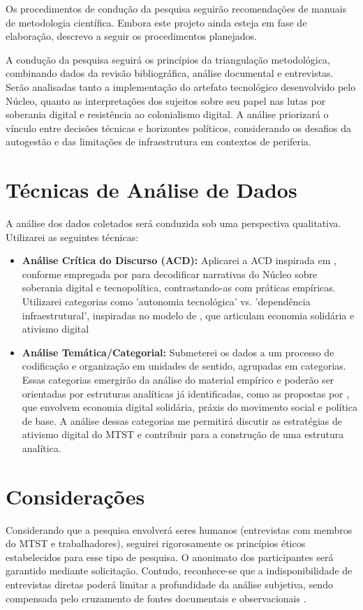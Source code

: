 Os procedimentos de condução da pesquisa seguirão recomendações de manuais de metodologia científica. Embora este projeto ainda esteja em fase de elaboração, descrevo a seguir os procedimentos planejados.

A condução da pesquisa seguirá os princípios da triangulação metodológica, combinando dados da revisão bibliográfica, análise documental e entrevistas. Serão analisadas tanto a implementação do artefato tecnológico desenvolvido pelo Núcleo, quanto as interpretações dos sujeitos sobre seu papel nas lutas por soberania digital e resistência ao colonialismo digital. A análise priorizará o vínculo entre decisões técnicas e horizontes políticos, considerando os desafios da autogestão e das limitações de infraestrutura em contextos de periferia.

\section{Técnicas de Análise de Dados}

A análise dos dados coletados será conduzida sob uma perspectiva qualitativa. Utilizarei as seguintes técnicas:

\begin{itemize}
    \item \textbf{Análise Crítica do Discurso (ACD):} Aplicarei a ACD inspirada em , conforme empregada por  para decodificar narrativas do Núcleo sobre soberania digital e tecnopolítica, contrastando-as com práticas empíricas. Utilizarei categorias como 'autonomia tecnológica' vs. 'dependência infraestrutural', inspiradas no modelo de , que articulam economia solidária e ativismo digital 

    \item \textbf{Análise Temática/Categorial:} Submeterei os dados a um processo de codificação e organização em unidades de sentido, agrupadas em categorias. Essas categorias emergirão da análise do material empírico e poderão ser orientadas por estruturas analíticas já identificadas, como as propostas por , que envolvem economia digital solidária, práxis do movimento social e política de base. A análise dessas categorias me permitirá discutir as estratégias de ativismo digital do MTST e contribuir para a construção de uma estrutura analítica.
\end{itemize}

\section{Considerações}

Considerando que a pesquisa envolverá seres humanos (entrevistas com membros do MTST e trabalhadores), seguirei rigorosamente os princípios éticos estabelecidos para esse tipo de pesquisa. O anonimato dos participantes será garantido mediante solicitação. Contudo, reconhece-se que a indisponibilidade de entrevistas diretas poderá limitar a profundidade da análise subjetiva, sendo compensada pelo cruzamento de fontes documentais e observacionais .


